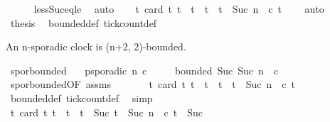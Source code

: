 \begin{isabellebody}
\ \ \ \ \isamarkupfalse%
\ less{\isacharunderscore}Suc{\isacharunderscore}eq{\isacharunderscore}le\ \isamarkupfalse%
\ auto\isanewline
\ \ \isamarkupfalse%
\ {\isacartoucheopen}{\isasymforall}t{\isachardot}\ card\ {\isacharbraceleft}t{\isacharprime}{\isachardot}\ t\ {\isasymle}\ t{\isacharprime}\ {\isasymand}\ t{\isacharprime}\ {\isacharless}\ t\ {\isacharplus}\ Suc\ n\ {\isasymand}\ c\ t{\isacharprime}{\isacharbraceright}\ {\isasymle}\ {}{\isacartoucheclose}\ \isamarkupfalse%
\ auto\isanewline
\ \ \isamarkupfalse%
\ {\isacharquery}thesis\ \isamarkupfalse%
\ bounded{\isacharunderscore}def\ tick{\isacharunderscore}count{\isacharunderscore}def\ \isacommand{{\isachardot}}\isamarkupfalse%
\isanewline
{}\isamarkupfalse%
%
\endisatagproof
{\isafoldproof}%
%
\isadelimproof
%
\endisadelimproof
%
\begin{isamarkuptext}%
An n-sporadic clock is (n+2, 2)-bounded.%
\end{isamarkuptext}\isamarkuptrue%
\isamarkupfalse%
\ spor{\isacharunderscore}bounded{}{\isacharcolon}\isanewline
\ \ \ {\isacartoucheopen}p{\isacharunderscore}sporadic\ n\ c{\isacartoucheclose}\isanewline
\ \ \ \ \ {\isacartoucheopen}bounded\ {\isacharparenleft}Suc\ {\isacharparenleft}Suc\ n{\isacharparenright}{\isacharparenright}\ {}\ c{\isacartoucheclose}\isanewline
%
\isadelimproof
%
\endisadelimproof
%
\isatagproof
{}\isamarkupfalse%
\ {\isacharminus}\isanewline
\ \ \isamarkupfalse%
\ spor{\isacharunderscore}bounded{\isacharbrackleft}OF\ assms{\isacharbrackright}\ \isamarkupfalse%
\isanewline
\ \ \ \ \ \ {\isacharasterisk}{\isacharcolon}{\isacartoucheopen}{\isasymforall}t{\isachardot}\ card\ {\isacharbraceleft}t{\isacharprime}{\isachardot}\ t\ {\isasymle}\ t{\isacharprime}\ {\isasymand}\ t{\isacharprime}\ {\isacharless}\ t\ {\isacharplus}\ Suc\ n\ {\isasymand}\ c\ t{\isacharprime}{\isacharbraceright}\ {\isasymle}\ {}{\isacartoucheclose}\isanewline
\ \ \ \ \isamarkupfalse%
\ bounded{\isacharunderscore}def\ tick{\isacharunderscore}count{\isacharunderscore}def\ \isamarkupfalse%
\ simp\isanewline
\ \ \isamarkupfalse%
\ {\isacartoucheopen}{\isasymforall}t{\isachardot}\ card\ {\isacharbraceleft}t{\isacharprime}{\isachardot}\ t\ {\isasymle}\ t{\isacharprime}\ {\isasymand}\ t{\isacharprime}\ {\isacharless}\ Suc\ {\isacharparenleft}t\ {\isacharplus}\ Suc\ n{\isacharparenright}\ {\isasymand}\ c\ t{\isacharprime}{\isacharbraceright}\ {\isasymle}\ Suc\ {}{\isacartoucheclose}\isanewline

\end{isabellebody}

